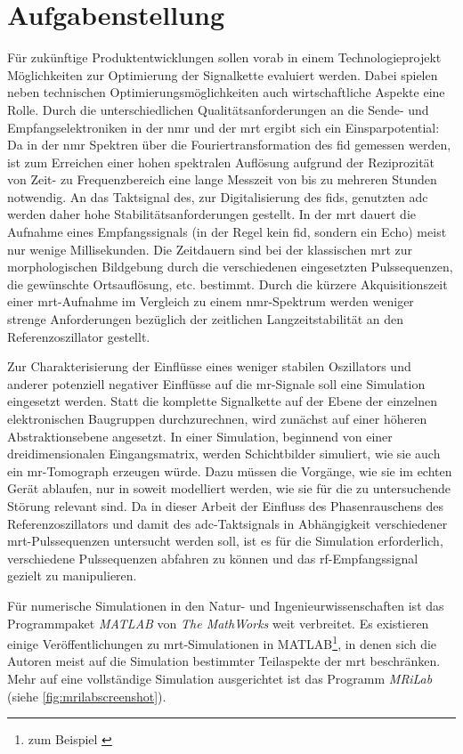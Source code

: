 \section{Aufgabenstellung}
Für zukünftige Produktentwicklungen sollen vorab in einem Technologie\-projekt Möglich\-keiten zur Optimierung der Signalkette evaluiert werden. Dabei spielen neben technischen Optimierungsmöglichkeiten auch wirtschaftliche Aspekte eine Rolle.
Durch die unterschiedlichen Qualitätsanforderungen an die Sende- und Empfangselektroniken in der \gls{nmr} und der \gls{mrt} ergibt sich ein Einsparpotential: Da in der \gls{nmr} Spektren über die Fouriertransformation des \gls{fid} gemessen werden, ist zum Erreichen einer hohen spektralen Auflösung aufgrund der Reziprozität von Zeit- zu Frequenzbereich eine lange Messzeit von bis zu mehreren Stunden notwendig. An das Taktsignal des, zur Digitalisierung des \gls{fid}s, genutzten \gls{adc} werden daher hohe Stabilitätsanforderungen gestellt. In der \gls{mrt} dauert die Aufnahme eines Empfangssignals (in der Regel kein \gls{fid}, sondern ein Echo) meist nur wenige Millisekunden. Die Zeitdauern sind bei der klassischen \gls{mrt} zur morphologischen Bildgebung durch die verschiedenen eingesetzten Pulssequenzen, die gewünschte Ortsauflösung, etc. bestimmt.
Durch die kürzere Akquisitionszeit einer \gls{mrt}-Aufnahme im Vergleich zu einem \gls{nmr}-Spektrum werden weniger strenge Anforderungen bezüglich der zeitlichen Langzeitstabilität an den Referenzoszillator gestellt.

Zur Charakterisierung der Einflüsse eines weniger stabilen Oszillators und anderer potenziell negativer Einflüsse auf die \gls{mr}-Signale soll eine Simulation eingesetzt werden. Statt die komplette Signalkette auf der Ebene der einzelnen elektronischen Baugruppen durchzurechnen, wird zunächst auf einer höheren Abstraktionsebene angesetzt. In einer Simulation, beginnend von einer dreidimensionalen Eingangsmatrix, werden Schichtbilder simuliert, wie sie auch ein \gls{mr}-Tomograph erzeugen würde. Dazu müssen die Vorgänge, wie sie im echten Gerät ablaufen, nur in soweit modelliert werden, wie sie für die zu untersuchende Störung relevant sind. Da in dieser Arbeit der Einfluss des Phasenrauschens des Referenzoszillators und damit des \gls{adc}-Taktsignals in Abhängigkeit verschiedener \gls{mrt}-Pulssequenzen untersucht werden soll, ist es für die Simulation erforderlich, verschiedene Pulssequenzen abfahren zu können und das \gls{rf}-Empfangssignal gezielt zu manipulieren.

Für numerische Simulationen in den Natur- und Ingenieurwissenschaften ist das Programmpaket \textit{MATLAB}\cite{matlab} von \textit{The MathWorks} weit verbreitet. Es existieren einige Ver\-öffent\-lichungen zu \gls{mrt}-Simulationen in MATLAB\footnote{zum Beispiel \cite{Kern2012}}, in denen sich die Autoren meist auf die Simulation bestimmter Teilaspekte der \gls{mrt} beschränken. Mehr auf eine vollständige Simulation ausgerichtet ist das Programm \textit{MRiLab}\cite{Liu2017} (siehe \autoref{fig:mrilabscreenshot}).

